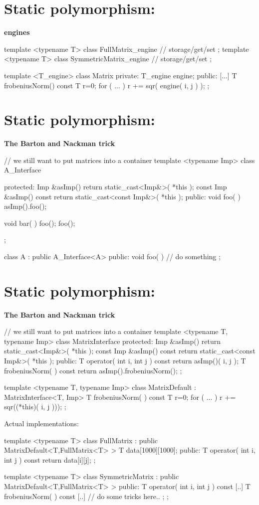 \section{Static polymorphism:} {\bf engines}
\begin{myverbatim}
template <typename T>
class FullMatrix_engine { // storage/get/set };
template <typename T>
class SymmetricMatrix_engine { // storage/get/set };

template <T_engine>
class Matrix {
private:
  T_engine engine;
public:
  [...]
  T frobeniusNorm() const {
    T r=0;
    for ( ... ) { r += sqr( engine( i, j ) ); }
  }
};
\end{myverbatim}

\section{Static polymorphism: } {\bf The Barton and Nackman trick}
\begin{myverbatim}
// we still want to put matrices into a container
template <typename Imp>
class A_Interface {
protected:
  Imp &asImp() { return static_cast<Imp&>( *this ); }
  const Imp &asImp() const { return static_cast<const Imp&>( *this ); }
public:
  void foo( ) { asImp().foo(); }

  void bar( ) { foo(); foo(); }
};

class A : public A_Interface<A> {
public:
  void foo( ) { // do something }
};
\end{myverbatim}


\section{Static polymorphism: } {\bf The Barton and Nackman trick}
{\small
\begin{myverbatim}
// we still want to put matrices into a container
template <typename T, typename Imp>
class MatrixInterface {
protected:
  Imp &asImp() { return static_cast<Imp&>( *this ); }
  const Imp &asImp() const { return static_cast<const Imp&>( *this ); }
public:
  T operator( int i, int j ) const { return asImp()( i, j ); }
  T frobeniusNorm( ) const { return asImp().frobeniusNorm(); }
};

template <typename T, typename Imp>
class MatrixDefault : MatrixInterface<T, Imp>{
  T frobeniusNorm( ) const {
    T r=0;
    for ( ... ) { r += sqr((*this)( i, j ))); }
  }
};
\end{myverbatim}

Actual implementations:
\begin{myverbatim}
template <typename T>
class FullMatrix : public MatrixDefault<T,FullMatrix<T> > {
  T data[1000][1000];
public:
  T operator( int i, int j ) const { return data[i][j]; }
};

template <typename T>
class SymmetricMatrix : public MatrixDefault<T,FullMatrix<T> > {
public:
  T operator( int i, int j ) const { [..] }
  T frobeniusNorm( ) const { [..] // do some tricks here.. ; }
};

\end{myverbatim}
}


